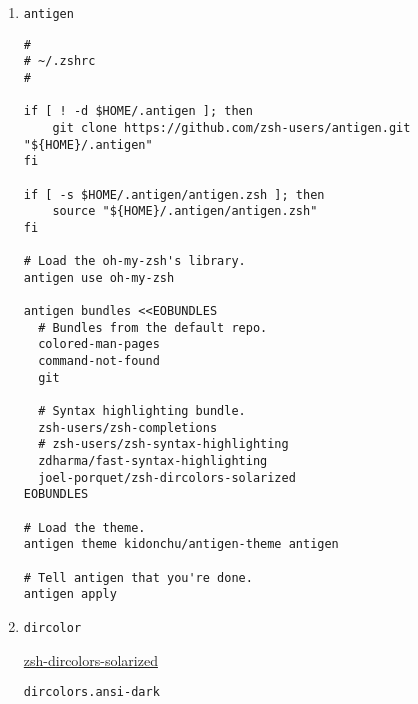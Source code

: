 \documentclass[11pt]{article}
\begin{document}
\begin{enumerate}
\item \texttt{antigen}
\label{sec:orgceaccb7}

\lstset{language=bash,label= ,caption= ,captionpos=b,numbers=none}
\begin{lstlisting}
#
# ~/.zshrc
#

if [ ! -d $HOME/.antigen ]; then
    git clone https://github.com/zsh-users/antigen.git "${HOME}/.antigen"
fi

if [ -s $HOME/.antigen/antigen.zsh ]; then
    source "${HOME}/.antigen/antigen.zsh"
fi

# Load the oh-my-zsh's library.
antigen use oh-my-zsh

antigen bundles <<EOBUNDLES
  # Bundles from the default repo.
  colored-man-pages
  command-not-found
  git

  # Syntax highlighting bundle.
  zsh-users/zsh-completions
  # zsh-users/zsh-syntax-highlighting
  zdharma/fast-syntax-highlighting
  joel-porquet/zsh-dircolors-solarized
EOBUNDLES

# Load the theme.
antigen theme kidonchu/antigen-theme antigen

# Tell antigen that you're done.
antigen apply
\end{lstlisting}

\item \texttt{dircolor}
\label{sec:org8d47b7d}

\href{https://github.com/joel-porquet/zsh-dircolors-solarized}{zsh-dircolors-solarized}

\lstset{language=bash,label= ,caption= ,captionpos=b,numbers=none}
\begin{lstlisting}
dircolors.ansi-dark
\end{lstlisting}
\end{enumerate}
\end{document}
